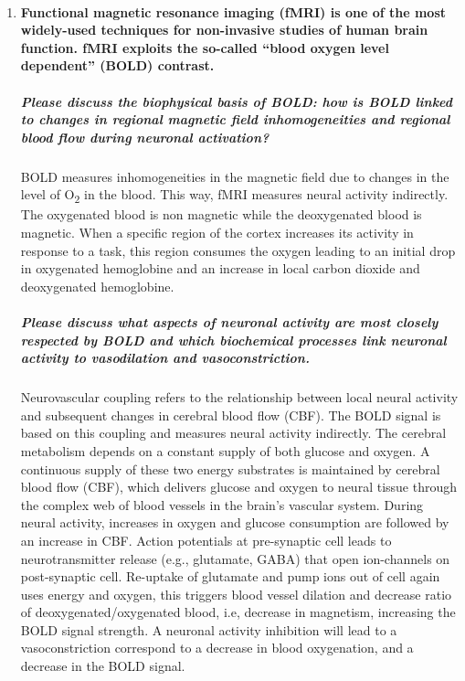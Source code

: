 \documentclass[12pt,article,oneside,a4paper]{memoir}
\begin{document}
\begin{enumerate}
\item \paragraph{Functional magnetic resonance imaging (fMRI) is one of the most widely-used techniques for non-invasive studies of human brain function.  fMRI exploits the so-called “blood oxygen level dependent” (BOLD) contrast.}

\subparagraph{Please discuss the biophysical basis of BOLD: how is BOLD linked to changes in regional magnetic field inhomogeneities and regional blood flow during neuronal activation?}
BOLD measures inhomogeneities in the magnetic field due to changes in the level of O\textsubscript{2} in the blood. This way, fMRI measures neural activity indirectly. The oxygenated blood is non magnetic while the deoxygenated blood is magnetic. When a specific region of the cortex increases its activity in response to a task, this region consumes the oxygen leading to an initial drop in oxygenated hemoglobine and an increase in local carbon dioxide and deoxygenated hemoglobine.

\subparagraph{Please discuss what aspects of neuronal activity are most closely respected by BOLD and which biochemical processes link neuronal activity to vasodilation and vasoconstriction.}

Neurovascular coupling refers to the relationship between local neural activity and subsequent changes in cerebral blood flow (CBF). The BOLD signal is based on this coupling and measures neural activity indirectly.
The cerebral metabolism depends on a constant supply of both glucose and oxygen. A continuous supply of these two energy substrates is maintained by cerebral blood flow (CBF), which delivers glucose and oxygen to neural tissue through the complex web of blood vessels in the brain’s vascular system. During neural activity, increases in oxygen and glucose consumption are followed by an increase in CBF.
Action potentials at pre-synaptic cell leads to neurotransmitter release (e.g., glutamate, GABA) that open ion-channels on post-synaptic cell. Re-uptake of glutamate and pump ions out of cell again uses energy and oxygen, this triggers blood vessel dilation and decrease ratio of deoxygenated/oxygenated blood, i.e, decrease in magnetism, increasing the BOLD signal strength. A neuronal activity inhibition will lead to a vasoconstriction correspond to a decrease  in blood oxygenation, and a decrease in the BOLD signal.


\end{enumerate}
\end{document}
